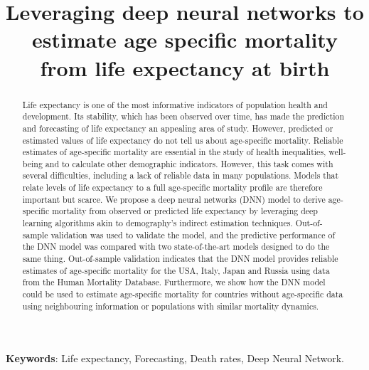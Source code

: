 \documentclass[a4,11pt]{article}
\title{Leveraging deep neural networks to estimate age specific mortality from life expectancy at birth}
\author{}
\begin{document}
	\maketitle
	
\begin{abstract}
Life expectancy is one of the most informative indicators of population health and development. Its stability, which has been observed over time, has made the prediction and forecasting of life expectancy an appealing area of study. However, predicted or estimated values of life expectancy do not tell us about age-specific mortality. Reliable estimates of age-specific mortality are essential in the study of health inequalities, well-being and to calculate other demographic indicators. However, this task comes with several difficulties, including a lack of reliable data in many populations. Models that relate levels of life expectancy to a full age-specific mortality profile are therefore important but scarce. We propose a deep neural networks (DNN) model to derive age-specific mortality from observed or predicted life expectancy by leveraging deep learning algorithms akin to demography's indirect estimation techniques. Out-of-sample validation was used to validate the model, and the predictive performance of the DNN model was compared with two state-of-the-art models designed to do the same thing. Out-of-sample validation indicates that the DNN model provides reliable estimates of age-specific mortality for the USA, Italy, Japan and Russia using data from the Human Mortality Database. 
Furthermore, we show how the DNN model could be used to estimate age-specific mortality for countries without age-specific data using neighbouring information or populations with similar mortality dynamics.


\end{abstract}
	\bigskip
	\begin{flushleft}
		\textbf{Keywords}: Life expectancy, Forecasting, Death rates, Deep Neural Network.
	\end{flushleft}
\end{document}

